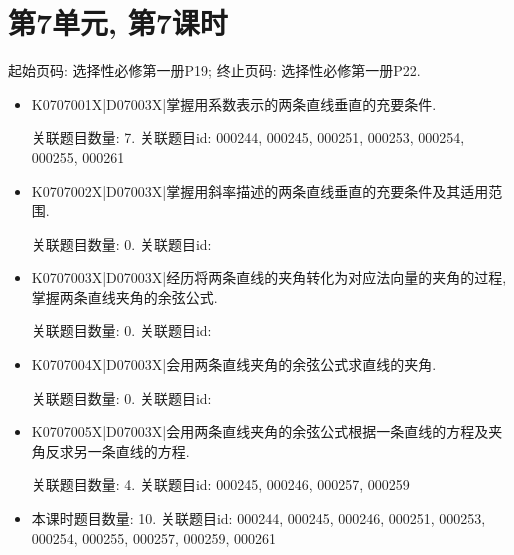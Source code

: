 \section*{第7单元, 第7课时}
起始页码: 选择性必修第一册P19; 终止页码: 选择性必修第一册P22.
\begin{itemize}
\item K0707001X|D07003X|掌握用系数表示的两条直线垂直的充要条件.

关联题目数量: 7. 关联题目id: 000244, 000245, 000251, 000253, 000254, 000255, 000261

\item K0707002X|D07003X|掌握用斜率描述的两条直线垂直的充要条件及其适用范围.

关联题目数量: 0. 关联题目id: 

\item K0707003X|D07003X|经历将两条直线的夹角转化为对应法向量的夹角的过程, 掌握两条直线夹角的余弦公式.

关联题目数量: 0. 关联题目id: 

\item K0707004X|D07003X|会用两条直线夹角的余弦公式求直线的夹角.

关联题目数量: 0. 关联题目id: 

\item K0707005X|D07003X|会用两条直线夹角的余弦公式根据一条直线的方程及夹角反求另一条直线的方程.

关联题目数量: 4. 关联题目id: 000245, 000246, 000257, 000259

\item 本课时题目数量: 10. 关联题目id: 000244, 000245, 000246, 000251, 000253, 000254, 000255, 000257, 000259, 000261

\end{itemize}

